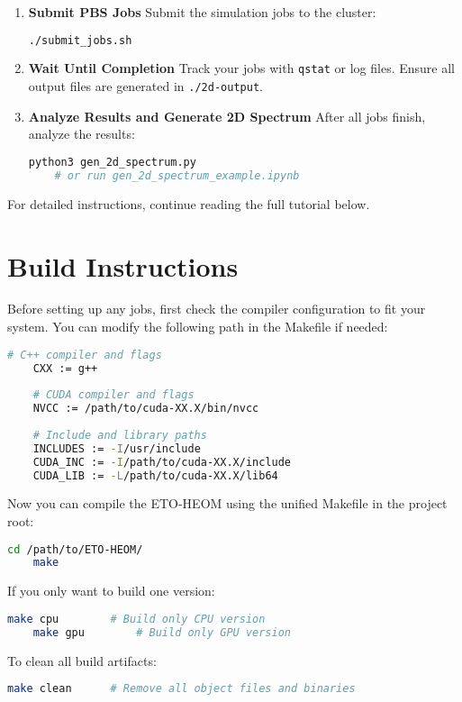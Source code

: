 \documentclass{article}
\begin{document}
\begin{enumerate}
    \item \textbf{Submit PBS Jobs}  
    Submit the simulation jobs to the cluster:
    \begin{lstlisting}[language=bash]
    ./submit_jobs.sh
    \end{lstlisting}

    \item \textbf{Wait Until Completion}  
    Track your jobs with \texttt{qstat} or log files. Ensure all output files are generated in \texttt{./2d-output}.

    \item \textbf{Analyze Results and Generate 2D Spectrum}  
    After all jobs finish, analyze the results:
    \begin{lstlisting}[language=bash]
    python3 gen_2d_spectrum.py
    # or run gen_2d_spectrum_example.ipynb
    \end{lstlisting}
\end{enumerate}

\vspace{1em}
For detailed instructions, continue reading the full tutorial below.

\newpage

\section{Build Instructions}

Before setting up any jobs, first check the compiler configuration to fit your system.
You can modify the following path in the Makefile if needed:

\begin{lstlisting}[language=bash]
    # C++ compiler and flags
    CXX := g++
    
    # CUDA compiler and flags
    NVCC := /path/to/cuda-XX.X/bin/nvcc
    
    # Include and library paths
    INCLUDES := -I/usr/include
    CUDA_INC := -I/path/to/cuda-XX.X/include
    CUDA_LIB := -L/path/to/cuda-XX.X/lib64
\end{lstlisting}
Now you can compile the ETO-HEOM using the unified Makefile in the project root:
\begin{lstlisting}[language=bash]
    cd /path/to/ETO-HEOM/
    make
\end{lstlisting}
If you only want to build one version:
\begin{lstlisting}[language=bash]
    make cpu        # Build only CPU version
    make gpu        # Build only GPU version
\end{lstlisting}
To clean all build artifacts:
\begin{lstlisting}[language=bash]
    make clean      # Remove all object files and binaries
\end{lstlisting}
\end{document}
